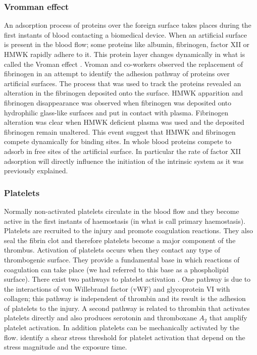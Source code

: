 \documentclass[%
 nofootinbib,
 amsmath,amssymb,
 aps,
 pra,
]{revtex4-1}
\begin{document}
\subsubsection{Vromman effect}
An adsorption process of proteins over the foreign surface takes places during the first instants of blood contacting a biomedical device. When an artificial surface is present in the blood flow; some proteins like albumin, fibrinogen, factor XII or HMWK rapidly adhere to it. This protein layer changes dynamically in what is called the Vroman effect \citet{Vroman:1980}. Vroman and co-workers observed the replacement of fibrinogen in an attempt to identify the adhesion pathway of proteins over artificial surfaces. The process that was used to track the proteins revealed an alteration in the fibrinogen deposited onto the surface. HMWK apparition and fibrinogen disappearance was observed when fibrinogen was deposited onto hydrophilic glass-like surfaces and put in contact with plasma. Fibrinogen alteration was clear when HMWK deficient plasma was used and the deposited fibrinogen remain unaltered. This event suggest that HMWK and fibrinogen compete dynamically for binding sites. In whole blood proteins compete to adsorb in free sites of the artificial surface. In particular the rate of factor XII adsorption will directly influence the initiation of the intrinsic system as it was previously explained. 

\subsubsection{Platelets}
Normally non-activated platelets circulate in the blood flow and they become active in the first instants of haemostasis (in what is call primary haemostasis). Platelets are recruited to the injury and promote coagulation reactions. They also seal the fibrin clot and therefore platelets become a major component of the thrombus. Activation of platelets occurs when they contact any type of thrombogenic surface. They provide a fundamental base in which reactions of coagulation can take place (we had referred to this base as a phospholipid surface). There exist two pathways to platelet activation \citep{Furie:2008}. One pathway is due to the interactions of von Willebrand factor (vWF) and glycoprotein VI with collagen; this pathway is independent of thrombin and its result is the adhesion of platelets to the injury. A second pathway is related to thrombin that activates platelets directly and also produces serotonin and thromboxane $A_{2}$ that amplify platelet activation. In addition platelets can be mechanically activated by the flow. \citet{Hellums:1994} identify a shear stress threshold for platelet activation that depend on the stress magnitude and the exposure time.\\
\end{document}
